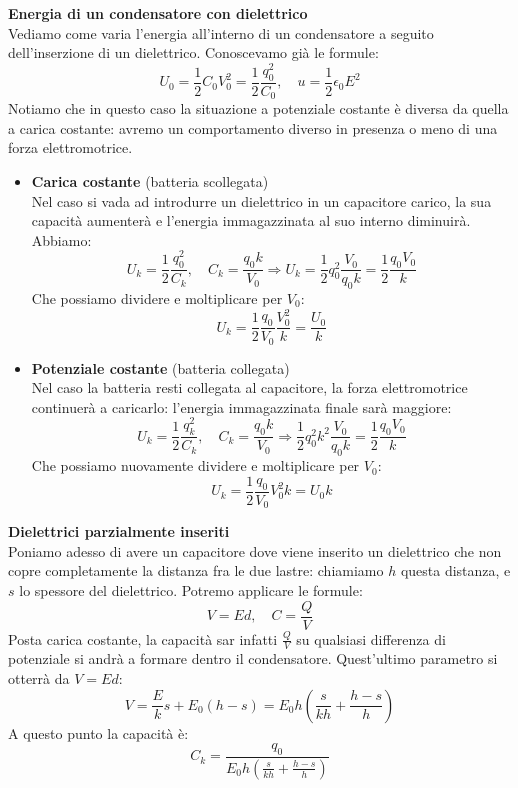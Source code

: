 \documentclass[a4paper,12pt]{article}
\begin{document}
\par\smallskip
\textbf{Energia di un condensatore con dielettrico} \\
Vediamo come varia l'energia all'interno di un condensatore a seguito dell'inserzione di un dielettrico. Conoscevamo già le formule:
$$ U_0 = \frac{1}{2}C_0V_0^2 = \frac{1}{2} \frac{q_0^2}{C_0}, \quad u = \frac{1}{2}\epsilon_0 E^2 $$
Notiamo che in questo caso la situazione a potenziale costante è diversa da quella a carica costante: avremo un comportamento diverso in presenza o meno di una forza elettromotrice.
\begin{itemize}
  \item \textbf{Carica costante} (batteria scollegata) \\
    Nel caso si vada ad introdurre un dielettrico in un capacitore carico, la sua capacità aumenterà e l'energia immagazzinata al suo interno diminuirà. Abbiamo:
    $$ U_k = \frac{1}{2} \frac{q_0^2}{C_k}, \quad C_k = \frac{q_0k}{V_0} \Rightarrow U_k = \frac{1}{2} q_0^2 \frac{V_0}{q_0k} = \frac{1}{2} \frac{q_0V_0}{k} $$
    Che possiamo dividere e moltiplicare per $V_0$:
    $$ U_k = \frac{1}{2} \frac{q_0}{V_0} \frac{V_0^2}{k} = \frac{U_0}{k} $$
  \item \textbf{Potenziale costante} (batteria collegata) \\
    Nel caso la batteria resti collegata al capacitore, la forza elettromotrice continuerà a caricarlo: l'energia immagazzinata finale sarà maggiore:
    $$ U_k = \frac{1}{2} \frac{q_k^2}{C_k}, \quad C_k = \frac{q_0k}{V_0} \Rightarrow \frac{1}{2} q_0^2k^2 \frac{V_0}{q_0k} = \frac{1}{2} \frac{q_0V_0}{k} $$
    Che possiamo nuovamente dividere e moltiplicare per $V_0$:
    $$ U_k = \frac{1}{2} \frac{q_0}{V_0} V_0^2 k = U_0k $$
\end{itemize}
\par\smallskip
\textbf{Dielettrici parzialmente inseriti} \\
Poniamo adesso di avere un capacitore dove viene inserito un dielettrico che non copre completamente la distanza fra le due lastre: chiamiamo $h$ questa distanza, e $s$ lo spessore del dielettrico.
Potremo applicare le formule:
$$ V = Ed, \quad C = \frac{Q}{V} $$
Posta carica costante, la capacità sar infatti $\frac{Q}{V}$ su qualsiasi differenza di potenziale si andrà a formare dentro il condensatore. Quest'ultimo parametro si otterrà da $V = Ed$:
$$ V = \frac{E}{k}s + E_0(h - s) = E_0h\left(\frac{s}{kh} + \frac{h - s}{h}\right) $$
A questo punto la capacità è:
$$ C_k = \frac{q_0}{E_0h\left(\frac{s}{kh} + \frac{h - s}{h}\right)} $$
\end{document}
